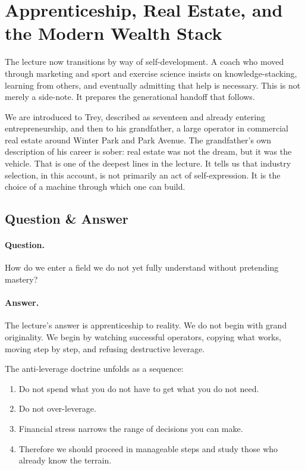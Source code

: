 \section{Apprenticeship, Real Estate, and the Modern Wealth Stack}

The lecture now transitions by way of self-development. A coach who moved through marketing and sport and exercise science insists on knowledge-stacking, learning from others, and eventually admitting that help is necessary. This is not merely a side-note. It prepares the generational handoff that follows.

We are introduced to Trey, described as seventeen and already entering entrepreneurship, and then to his grandfather, a large operator in commercial real estate around Winter Park and Park Avenue. The grandfather's own description of his career is sober: real estate was not the dream, but it was the vehicle. That is one of the deepest lines in the lecture. It tells us that industry selection, in this account, is not primarily an act of self-expression. It is the choice of a machine through which one can build.

\subsection{Question \& Answer}

\paragraph{Question.} How do we enter a field we do not yet fully understand without pretending mastery?

\paragraph{Answer.} The lecture's answer is apprenticeship to reality. We do not begin with grand originality. We begin by watching successful operators, copying what works, moving step by step, and refusing destructive leverage.

The anti-leverage doctrine unfolds as a sequence:
\begin{enumerate}
\item Do not spend what you do not have to get what you do not need.
\item Do not over-leverage.
\item Financial stress narrows the range of decisions you can make.
\item Therefore we should proceed in manageable steps and study those who already know the terrain.
\end{enumerate}

